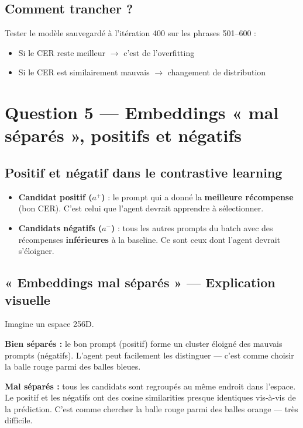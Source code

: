 \documentclass[11pt,a4paper]{article}
\begin{document}
\subsection{Comment trancher ?}

Tester le modèle sauvegardé à l'itération 400 sur les phrases 501--600 :
\begin{itemize}
    \item Si le CER reste meilleur $\rightarrow$ c'est de l'overfitting
    \item Si le CER est similairement mauvais $\rightarrow$ changement de distribution
\end{itemize}

\section{Question 5 — Embeddings « mal séparés », positifs et négatifs}

\subsection{Positif et négatif dans le contrastive learning}

\begin{itemize}
    \item \textbf{Candidat positif ($a^+$)} : le prompt qui a donné la \textbf{meilleure récompense} (bon CER). C'est celui que l'agent devrait apprendre à sélectionner.
    \item \textbf{Candidats négatifs ($a^-$)} : tous les autres prompts du batch avec des récompenses \textbf{inférieures} à la baseline. Ce sont ceux dont l'agent devrait s'éloigner.
\end{itemize}

\subsection{« Embeddings mal séparés » — Explication visuelle}

Imagine un espace 256D. 

\textbf{Bien séparés :} le bon prompt (positif) forme un cluster éloigné des mauvais prompts (négatifs). L'agent peut facilement les distinguer — c'est comme choisir la balle rouge parmi des balles bleues.

\textbf{Mal séparés :} tous les candidats sont regroupés au même endroit dans l'espace. Le positif et les négatifs ont des cosine similarities presque identiques vis-à-vis de la prédiction. C'est comme chercher la balle rouge parmi des balles orange — très difficile.
\end{document}

